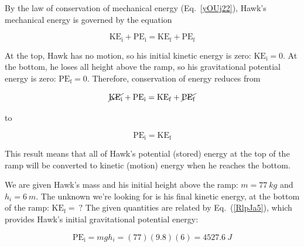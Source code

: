 \documentclass{article}
\numberwithin{equation}{section}
\numberwithin{figure}{section}
\begin{document}
\begin{center}
\end{center}

\Solution By the law of conservation of mechanical energy (Eq.~\ref{yOUj22}), Hawk's mechanical energy is governed by the equation

\begin{equation*} 
    \mathrm{KE_i} + \mathrm{PE_i} = \mathrm{KE_f} + \mathrm{PE_f}
\end{equation*}

At the top, Hawk has no motion, so his initial kinetic energy is zero: $\mathrm{KE_i} = 0$. At the bottom, he loses all height above the ramp, so his gravitational potential energy is zero: $\mathrm{PE_f} = 0$. Therefore, conservation of energy reduces from

\begin{equation*}
        \cancel{\mathrm{KE_i}} + \mathrm{PE_i} = \mathrm{KE_f} + \cancel{\mathrm{PE_f}}
\end{equation*}

to

\begin{equation} \label{eosZpi}
    \mathrm{PE_i} = \mathrm{KE_f}
\end{equation}

This result means that all of Hawk's potential (stored) energy at the top of the ramp will be converted to kinetic (motion) energy when he reaches the bottom.
\vspace{1em}

We are given Hawk's mass and his initial height above the ramp: $m = \SI{77}{kg}$ and $h_i = \SI{6}{m}$. The unknown we're looking for is his final kinetic energy, at the bottom of the ramp: $\mathrm{KE_f} =\ ?$ The given quantities are related by Eq.~(\ref{RlpJa5}), which provides Hawk's initial gravitational potential energy:

\begin{equation*}
    \mathrm{PE_i} = mgh_i = (77)(9.8)(6) = \SI{4527.6}{J} 
\end{equation*}
\end{document}
